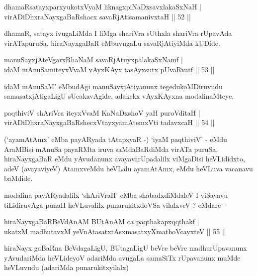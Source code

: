 \begin{shl}
dhamaRsatayxparxyukotxV\s yaM liknagxpiNaDxsavxlakaSxNaH |\\
virADiDhxraNayxgaBaRshacx savaRjAtisamanivxtaH \hfill || 52 ||
\end{shl}


\begin{artha}
dhamaR, satayx ivugaLiMda I liMga shariVra sUthxla shariVra rUpavAda virATapuruSa, hiraNayxgaBaR eMbuvugaLu savaRjAtiyiMda kUDide.
\end{artha}

\begin{shl}
manuSayxjAteVgarxRhaNaM savaRjAtuyxpalakaSxNamf |\\
idaM mAnuSamiteyxVvaM vAyxKAyx tasAyxsutx pUvaRvatf \hfill || 53 ||
\end{shl}

\begin{artha}
idaM mAnuSaM' eMbudAgi manuSayxjAtiyanunx tegedukoMDiruvudu samasatxjAtigaLigU sUcakavAgide, adakekx vAyxKAyxna modalinaMteye.
\end{artha}

\begin{shl}
paqthiviV shAriVra iteyxVvaM KaNaDxshoV yaH puroVditaH |\\
virADiDhxraNayxgaBaRshecxVtayxyamAtemxVti tadavxcaH \hfill || 54 ||
\end{shl}

\begin{artha}
(`ayamAtAmx' eMba payARyada tAtapxyaR -) `iyaM paqthiviV' - eMdu   AraMBisi mAnuSa payaRMta iruva saMdaBaRdiMda virATa puruSa,   hiraNayxgaBaR eMdu yAvudanunx avayavarUpadalilx viMgaDisi   heVLididxto, adeV (avayaviyeV) AtamxveMdu heVLalu ayamAtAmx, eMdu   heVLuva vacanavu baMdide.
\end{artha}

\begin{artha}
modalina payARyadalilx `shAriVraH' eMba shabadxdiMdaleV I viSayavu tiLidiruvAga punaH heVLuvalilx punarukitxdoVSa vilalxveV ? 
eMdare -
\end{artha}

\begin{shl}
hiraNayxgaBaRBeVdAnAM BUtAnAM ca paqthakapxqqthakf |\\
ukatxM madhutavxM yeVnAtasatxtAsxmasatxyXmathoVcayxteV \hfill || 55 ||
\end{shl}

\begin{artha}
hiraNayx gaBaRna BeVdagaLigU, BUtagaLigU beVre beVre madhurUpavanunx
yAvudariMda heVLideyoV adariMda avugaLa samaSiTx rUpavanunx muMde
heVLuvudu (adariMda punarukitxyilalx) 
\end{artha}

